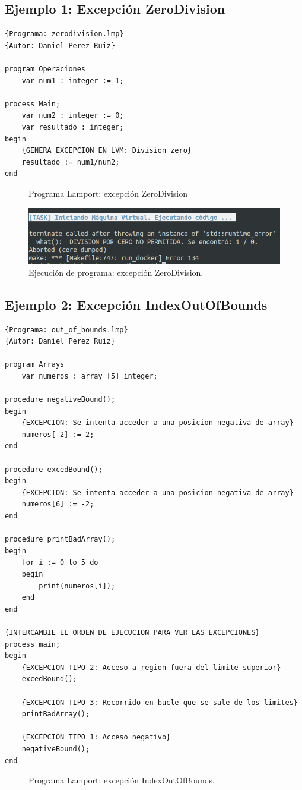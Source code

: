 \subsection{Ejemplo 1: Excepción ZeroDivision}
\begin{lstlisting}[style=lamportStyle]
{Programa: zerodivision.lmp}
{Autor: Daniel Perez Ruiz}

program Operaciones
	var num1 : integer := 1;

process Main;
	var num2 : integer := 0;
	var resultado : integer;
begin
	{GENERA EXCEPCION EN LVM: Division zero}
	resultado := num1/num2;
end
\end{lstlisting}
\begin{figure}[h]
\caption{Programa Lamport: excepción ZeroDivision}
\label{fig:lamportExceptionZeroDivision}
\end{figure}

\begin{figure}[h]
    \includegraphics[width=\linewidth]{images/ejemplos/exceptions/zerodivision.png}
    \caption{Ejecución de programa: excepción ZeroDivision.}
    \label{fig:lamportExceptionZeroDivision_exec}
\end{figure}

\newpage
\subsection{Ejemplo 2: Excepción IndexOutOfBounds}
\begin{lstlisting}[style=lamportStyle]
{Programa: out_of_bounds.lmp}
{Autor: Daniel Perez Ruiz}

program Arrays
	var numeros : array [5] integer;

procedure negativeBound();
begin
	{EXCEPCION: Se intenta acceder a una posicion negativa de array}
	numeros[-2] := 2;
end

procedure excedBound();
begin
	{EXCEPCION: Se intenta acceder a una posicion negativa de array}
	numeros[6] := -2;
end

procedure printBadArray();
begin
	for i := 0 to 5 do
	begin
		print(numeros[i]);
	end
end
	
{INTERCAMBIE EL ORDEN DE EJECUCION PARA VER LAS EXCEPCIONES}
process main;
begin
	{EXCEPCION TIPO 2: Acceso a region fuera del limite superior}
	excedBound();
	
	{EXCEPCION TIPO 3: Recorrido en bucle que se sale de los limites}
	printBadArray();

	{EXCEPCION TIPO 1: Acceso negativo}
	negativeBound();
end
\end{lstlisting}
\begin{figure}[h]
\caption{Programa Lamport: excepción IndexOutOfBounds.}
\label{fig:lamportExceptionOutOfBounds}
\end{figure}

